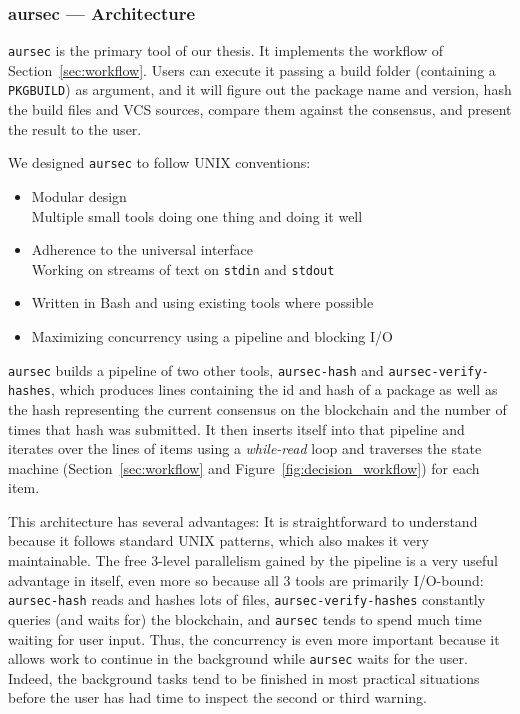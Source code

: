\subsubsection{aursec --- Architecture}
\texttt{aursec} is the primary tool of our thesis. It implements the workflow of Section~\ref{sec:workflow}. Users can execute it passing a build folder (containing a \texttt{PKGBUILD}) as argument, and it will figure out the package name and version, hash the build files and VCS sources, compare them against the consensus, and present the result to the user.

We designed \texttt{aursec} to follow UNIX conventions:

\begin{itemize}
\item Modular design \\ Multiple small tools doing one thing and doing it well
\item Adherence to the universal interface \cite{Salus:1994} \\
  Working on streams of text on \texttt{stdin} and \texttt{stdout}
\item Written in Bash and using existing tools where possible
\item Maximizing concurrency using a pipeline and blocking I/O
\end{itemize}

\texttt{aursec} builds a pipeline of two other tools, \texttt{aursec-hash} and \texttt{aursec-verify-hashes}, which produces lines containing the id and hash of a package as well as the hash representing the current consensus on the blockchain and the number of times that hash was submitted.
It then inserts itself into that pipeline and iterates over the lines of items using a \emph{while-read} loop and traverses the state machine (Section~\ref{sec:workflow} and Figure~\ref{fig:decision_workflow}) for each item.

This architecture has several advantages: It is straightforward to understand because it follows standard UNIX patterns, which also makes it very maintainable.
The free 3-level parallelism gained by the pipeline is a very useful advantage in itself, even more so because all 3 tools are primarily I/O-bound: \texttt{aursec-hash} reads and hashes lots of files, \texttt{aursec-verify-hashes} constantly queries (and waits for) the blockchain, and \texttt{aursec} tends to spend much time waiting for user input.
Thus, the concurrency is even more important because it allows work to continue in the background while \texttt{aursec} waits for the user. Indeed, the background tasks tend to be finished in most practical situations before the user has had time to inspect the second or third warning. %

